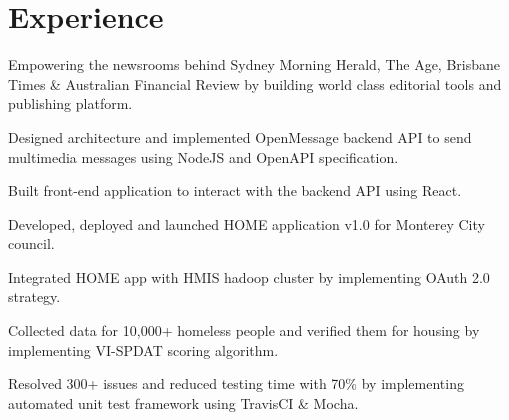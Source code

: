 \documentclass[]{deedy-resume-openfont}
\begin{document}
\begin{minipage}[t]{0.33\textwidth}
%
%

\end{minipage} 
\hfill
\begin{minipage}[t]{0.66\textwidth} 


\section{Experience}

\vspace{\topsep} %
\begin{tightemize}
\item Empowering the newsrooms behind Sydney Morning Herald, The Age, Brisbane Times \& Australian Financial Review by building world class editorial tools and publishing platform.
\end{tightemize}
\sectionsep

\begin{tightemize}
\item Designed architecture and implemented OpenMessage backend API to send multimedia messages using NodeJS and OpenAPI specification.
\item Built front-end application to interact with the backend API using React.
\end{tightemize}
\sectionsep

\begin{tightemize}
\item Developed, deployed and launched HOME application v1.0 for Monterey City council.
\item Integrated HOME app with HMIS hadoop cluster by implementing OAuth 2.0 strategy.
\item Collected data for 10,000+ homeless people and verified them for housing by implementing VI-SPDAT scoring algorithm.
\item Resolved 300+ issues and reduced testing time with 70\% by implementing automated unit test framework using TravisCI \& Mocha.
\end{tightemize}
\sectionsep


\end{minipage}
\end{document}
